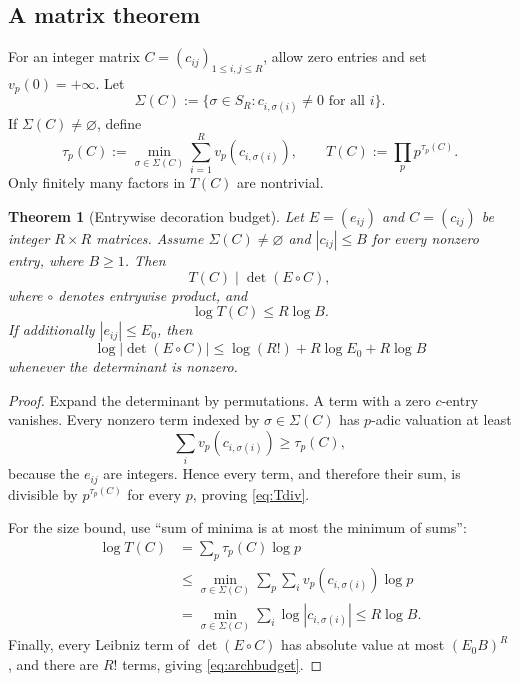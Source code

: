 \documentclass[11pt,oneside]{article}
\newtheorem{theorem}{Theorem}[section]
\theoremstyle{definition}
\theoremstyle{remark}
\newcommand{\abs}[1]{\left|#1\right|}
\begin{document}
\subsection{A matrix theorem}

For an integer matrix $C=(c_{ij})_{1\le i,j\le R}$, allow zero entries and
set $v_p(0)=+\infty$.  Let
\[
 \Sigma(C):=\{\sigma\in S_R:c_{i,\sigma(i)}\ne0\text{ for all }i\}.
\]
If $\Sigma(C)\ne\varnothing$, define
\begin{equation}
 \tau_p(C):=\min_{\sigma\in\Sigma(C)}
 \sum_{i=1}^R v_p(c_{i,\sigma(i)}),
 \qquad
 T(C):=\prod_p p^{\tau_p(C)}.
 \label{eq:tau}
\end{equation}
Only finitely many factors in $T(C)$ are nontrivial.

\begin{theorem}[Entrywise decoration budget]
\label{thm:decoration}
Let $E=(e_{ij})$ and $C=(c_{ij})$ be integer $R\times R$ matrices.  Assume
$\Sigma(C)\ne\varnothing$ and $\abs{c_{ij}}\le B$ for every nonzero entry,
where $B\ge1$.  Then
\begin{equation}
  T(C)\mid\det(E\circ C),
  \label{eq:Tdiv}
\end{equation}
where $\circ$ denotes entrywise product, and
\begin{equation}
  \log T(C)\le R\log B.
  \label{eq:Tbound}
\end{equation}
If additionally $\abs{e_{ij}}\le E_0$, then
\begin{equation}
 \log\abs{\det(E\circ C)}
 \le\log(R!)+R\log E_0+R\log B
 \label{eq:archbudget}
\end{equation}
whenever the determinant is nonzero.
\end{theorem}

\begin{proof}
Expand the determinant by permutations.  A term with a zero $c$-entry
vanishes.  Every nonzero term indexed by $\sigma\in\Sigma(C)$ has $p$-adic
valuation at least
\[
 \sum_i v_p(c_{i,\sigma(i)})\ge\tau_p(C),
\]
because the $e_{ij}$ are integers.  Hence every term, and therefore their sum,
is divisible by $p^{\tau_p(C)}$ for every $p$, proving \eqref{eq:Tdiv}.

For the size bound, use ``sum of minima is at most the minimum of sums'':
\begin{align*}
 \log T(C)
 &=\sum_p\tau_p(C)\log p\\
 &\le\min_{\sigma\in\Sigma(C)}
   \sum_p\sum_i v_p(c_{i,\sigma(i)})\log p\\
 &=\min_{\sigma\in\Sigma(C)}
   \sum_i\log\abs{c_{i,\sigma(i)}}
 \le R\log B.
\end{align*}
Finally, every Leibniz term of $\det(E\circ C)$ has absolute value at most
$(E_0B)^R$, and there are $R!$ terms, giving \eqref{eq:archbudget}.
\end{proof}
\end{document}
